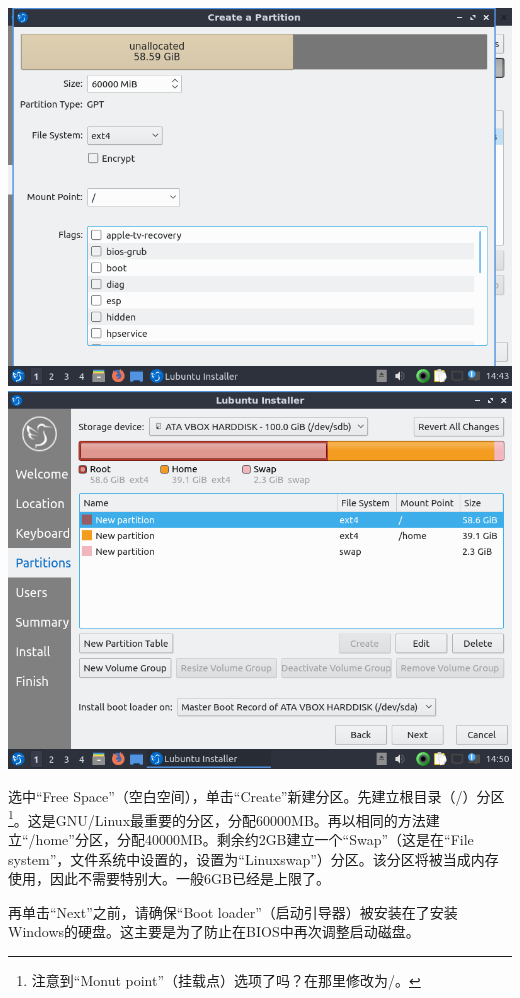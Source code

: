 \documentclass{book}
\begin{document}
\begin{center}
	\includegraphics[scale=0.4]{pic/lubinst10}	\includegraphics[scale=0.4]{pic/lubinst11}
\end{center}
选中“Free Space”（空白空间），单击“Create”新建分区。先建立根目录（/）分区\footnote{注意到“Monut point”（挂载点）选项了吗？在那里修改为/。}。这是GNU/Linux最重要的分区，分配60000MB。再以相同的方法建立“/home”分区，分配40000MB。剩余约2GB建立一个“Swap”（这是在“File system”，文件系统中设置的，设置为“Linuxswap”）分区。该分区将被当成内存使用，因此不需要特别大。一般6GB已经是上限了。\par
再单击“Next”之前，请确保“Boot loader”（启动引导器）被安装在了安装Windows的硬盘。这主要是为了防止在BIOS中再次调整启动磁盘。
\end{document}
